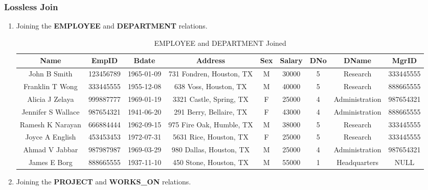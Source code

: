 \documentclass[a4paper,11pt]{article}
\begin{document}
\subsubsection{Lossless Join}
\begin{enumerate}
\item Joining the \textbf{EMPLOYEE} and \textbf{DEPARTMENT} relations.

\begin{table}[H]
\sffamily
\scriptsize
\begin{tabular}{|c|c|c|c|c|c|c|c|c|}
\hline
\rowcolor{lightgray}
	Name & EmpID & Bdate & Address & Sex & Salary & DNo & DName & MgrID\\
\hline
	John B Smith & 123456789 & 1965-01-09 & 731 Fondren, Houston, TX & M & 30000 & 5 & Research & 333445555\\
\hline
	Franklin T Wong & 333445555 & 1955-12-08 & 638 Voss, Houston, TX & M & 40000 & 5 & Research & 888665555\\
\hline
	Alicia J Zelaya & 999887777 & 1969-01-19 & 3321 Castle, Spring, TX & F & 25000 & 4 & Administration & 987654321\\
\hline
	Jennifer S Wallace & 987654321 & 1941-06-20 & 291 Berry, Bellaire, TX & F & 43000 & 4 & Administration & 888665555\\
\hline
	Ramesh K Narayan & 666884444 & 1962-09-15 & 975 Fire Oak, Humble, TX & M & 38000 & 5 & Research & 333445555\\
\hline
	Joyce A English & 453453453 & 1972-07-31 & 5631 Rice, Houston, TX & F & 25000 & 5 & Research & 333445555 \\
\hline
	Ahmad V Jabbar & 987987987 & 1969-03-29 & 980 Dallas, Houston, TX & M & 25000 & 4 & Administration & 987654321\\
\hline
	James E Borg & 888665555 & 1937-11-10 & 450 Stone, Houston, TX & M & 55000 & 1 & Headquarters & NULL	\\
\hline
\end{tabular}
\label{tab:tab1}
\caption{EMPLOYEE and DEPARTMENT Joined}
\end{table}

\item Joining the \textbf{PROJECT} and \textbf{WORKS\_ON} relations.
\begin{table}[H]
\centering
\sffamily
\scriptsize


\end{table}
\end{enumerate}
\end{document}
